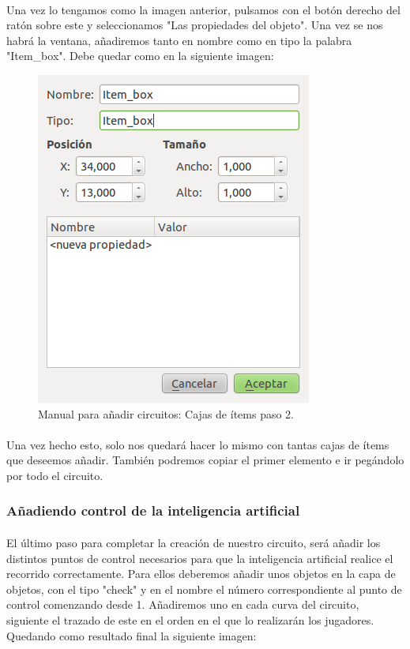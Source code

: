 \paragraph{}
Una vez lo tengamos como la imagen anterior, pulsamos con el botón derecho del ratón sobre este y seleccionamos "Las propiedades
del objeto". Una vez se nos habrá la ventana, añadiremos tanto en nombre como en tipo la palabra "Item\_box". Debe quedar como en la
siguiente imagen:

\begin{figure}[H]
  \label{cajas_items2}
  \begin{center}
    \includegraphics[scale=0.5]{imagenes/manualcircuito/cajas_items2.png}
  \end{center}
  \caption{Manual para añadir circuitos: Cajas de ítems paso 2.}
\end{figure}

\paragraph{}
Una vez hecho esto, solo nos quedará hacer lo mismo con tantas cajas de ítems que deseemos añadir. También podremos copiar el 
primer elemento e ir pegándolo por todo el circuito.

\subsubsection{Añadiendo control de la inteligencia artificial}

\paragraph{}
El último paso para completar la creación de nuestro circuito, será añadir los distintos puntos de control necesarios para que
la inteligencia artificial realice el recorrido correctamente. Para ellos deberemos añadir unos objetos en la capa de objetos, con
el tipo "check" y en el nombre el número correspondiente al punto de control comenzando desde 1. Añadiremos uno en cada curva del
circuito, siguiente el trazado de este en el orden en el que lo realizarán los jugadores. Quedando como resultado final la 
siguiente imagen:


